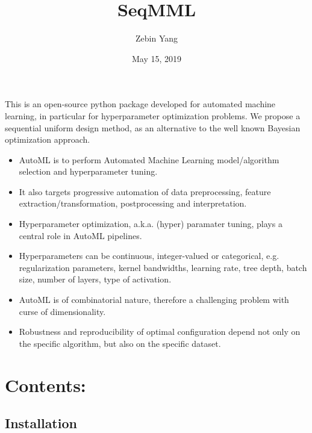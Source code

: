 \documentclass[letterpaper,10pt,english]{sphinxmanual}
\title{SeqMML}
\date{May 15, 2019}
\author{Zebin Yang}
\begin{document}
\pagestyle{empty}
\sphinxmaketitle
\pagestyle{plain}
\sphinxtableofcontents
\pagestyle{normal}
\label{\detokenize{index::doc}}


This is an open-source python package developed for automated machine learning, in particular for hyperparameter optimization problems. We propose a sequential uniform design method, as an alternative to the well known Bayesian optimization approach.

\begin{itemize}
\item {} 
AutoML is to perform Automated Machine Learning model/algorithm selection and hyperparameter tuning.

\item {} 
It also targets progressive automation of data preprocessing, feature extraction/transformation, postprocessing and interpretation.

\item {} 
Hyperparameter optimization, a.k.a. (hyper) paramater tuning, plays a central role in AutoML pipelines.

\end{itemize}

\noindent{}

\begin{itemize}
\item {} 
Hyperparameters can be continuous, integer-valued or categorical, e.g. regularization parameters, kernel bandwidths, learning rate, tree depth, batch size, number of layers, type of activation.

\item {} 
AutoML is of combinatorial nature, therefore a challenging problem with curse of dimensionality.

\item {} 
Robustness and reproducibility of optimal configuration depend not only on the specific algorithm, but also on the specific dataset.

\end{itemize}


\chapter{Contents:}
\label{\detokenize{index:contents}}

\section{Installation}
\label{\detokenize{installation:installation}}\label{\detokenize{installation::doc}}
\end{document}

